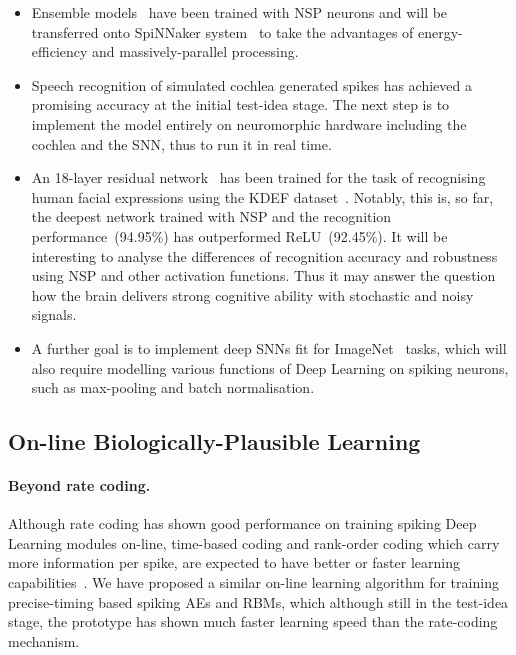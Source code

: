 \begin{itemize}
	\item Ensemble models~\citep{rokach2010ensemble} have been trained with NSP neurons and will be transferred onto SpiNNaker system~\citep{furber2014spinnaker} to take the advantages of energy-efficiency and massively-parallel processing.
	\item Speech recognition of simulated cochlea generated spikes has achieved a promising accuracy at the initial test-idea stage.
	The next step is to implement the model entirely on neuromorphic hardware including the cochlea and the SNN, thus to run it in real time.
	\item An 18-layer residual network~\citep{he2016deep} has been trained for the task of recognising human facial expressions using the KDEF dataset~\citep{lundqvist1998karolinska}.
	Notably, this is, so far, the deepest network trained with NSP and the recognition performance~(94.95\%) has outperformed ReLU~(92.45\%).
	It will be interesting to analyse the differences of recognition accuracy and robustness using NSP and other activation functions.
	Thus it may answer the question how the brain delivers strong cognitive ability with stochastic and noisy signals.
 	\item A further goal is to implement deep SNNs fit for ImageNet~\citep{deng2009imagenet} tasks, which will also require modelling various functions of Deep Learning on spiking neurons, such as max-pooling and batch normalisation. 

\end{itemize}


\subsection{On-line Biologically-Plausible Learning}
\paragraph{Beyond rate coding.}
Although rate coding has shown good performance on training spiking Deep Learning modules on-line, time-based coding and rank-order coding which carry more information per spike, are expected to have better or faster learning capabilities~\citep{gautrais1998rate}.
We have proposed a similar on-line learning algorithm for training precise-timing based spiking AEs and RBMs, which although still in the test-idea stage, the prototype has shown much faster learning speed than the rate-coding mechanism.

